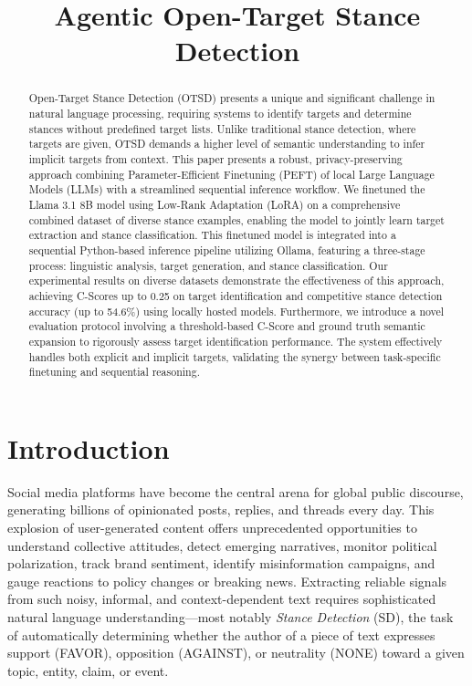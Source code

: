 \documentclass[conference]{IEEEtran}
\begin{document}
\title{Agentic Open-Target Stance Detection 
}



\maketitle

\begin{abstract}
Open-Target Stance Detection (OTSD) presents a unique and significant challenge in natural language processing, requiring systems to identify targets and determine stances without predefined target lists. Unlike traditional stance detection, where targets are given, OTSD demands a higher level of semantic understanding to infer implicit targets from context. This paper presents a robust, privacy-preserving approach combining Parameter-Efficient Finetuning (PEFT) of local Large Language Models (LLMs) with a streamlined sequential inference workflow. We finetuned the Llama 3.1 8B model using Low-Rank Adaptation (LoRA) on a comprehensive combined dataset of diverse stance examples, enabling the model to jointly learn target extraction and stance classification. This finetuned model is integrated into a sequential Python-based inference pipeline utilizing Ollama, featuring a three-stage process: linguistic analysis, target generation, and stance classification. Our experimental results on diverse datasets demonstrate the effectiveness of this approach, achieving C-Scores up to 0.25 on target identification and competitive stance detection accuracy (up to 54.6\%) using locally hosted models. Furthermore, we introduce a novel evaluation protocol involving a threshold-based C-Score and ground truth semantic expansion to rigorously assess target identification performance. The system effectively handles both explicit and implicit targets, validating the synergy between task-specific finetuning and sequential reasoning.
\end{abstract}

\section{Introduction}

Social media platforms have become the central arena for global public discourse, generating billions of opinionated posts, replies, and threads every day. This explosion of user-generated content offers unprecedented opportunities to understand collective attitudes, detect emerging narratives, monitor political polarization, track brand sentiment, identify misinformation campaigns, and gauge reactions to policy changes or breaking news. Extracting reliable signals from such noisy, informal, and context-dependent text requires sophisticated natural language understanding—most notably \emph{Stance Detection} (SD), the task of automatically determining whether the author of a piece of text expresses support (FAVOR), opposition (AGAINST), or neutrality (NONE) toward a given topic, entity, claim, or event.
\end{document}
